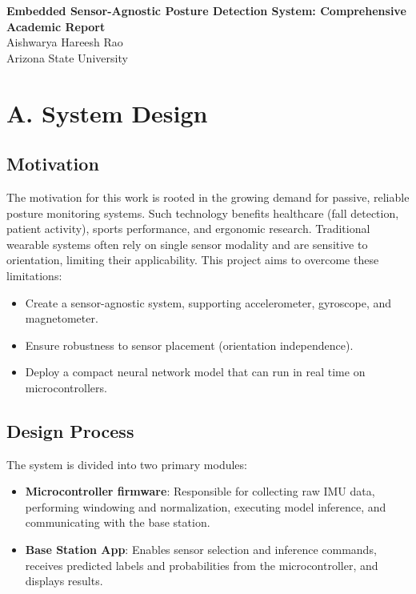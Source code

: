 \documentclass[12pt]{article}
\begin{document}
\begin{center}
    {\Large\bfseries Embedded Sensor-Agnostic Posture Detection System: Comprehensive Academic Report}\\[10pt]
    {\large Aishwarya Hareesh Rao}\\
    Arizona State University
\end{center}

\vspace{0.7cm}

\section*{A. System Design}

\subsection*{Motivation}
The motivation for this work is rooted in the growing demand for passive, reliable posture monitoring systems. Such technology benefits healthcare (fall detection, patient activity), sports performance, and ergonomic research. Traditional wearable systems often rely on single sensor modality and are sensitive to orientation, limiting their applicability. This project aims to overcome these limitations:
\begin{itemize}
    \item Create a sensor-agnostic system, supporting accelerometer, gyroscope, and magnetometer.
    \item Ensure robustness to sensor placement (orientation independence).
    \item Deploy a compact neural network model that can run in real time on microcontrollers.
\end{itemize}

\subsection*{Design Process}
The system is divided into two primary modules:
\begin{itemize}
    \item \textbf{Microcontroller firmware}: Responsible for collecting raw IMU data, performing windowing and normalization, executing model inference, and communicating with the base station.
    \item \textbf{Base Station App}: Enables sensor selection and inference commands, receives predicted labels and probabilities from the microcontroller, and displays results.
\end{itemize}
\end{document}
